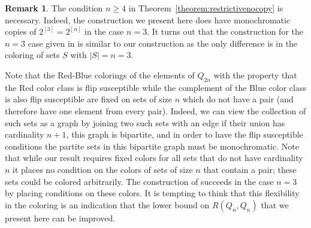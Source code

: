 \documentclass[12pt]{article}
\theoremstyle{definition}
\newtheorem{rek}[thm]{Remark}
\newcommand{\bp}{\begin{proof}}
\newcommand{\ep}{\end{proof}}
\newcommand{\cube}{2^{[n]}}
\begin{document}
\begin{rek}
The condition $ n \ge 4$ in Theorem~\ref{theorem:restrictivenocopy} is necessary. Indeed,
the construction we present here does have monochromatic copies of $ 2^{[3]}= 2^{[n]}$ in the case $n=3$. It turns out that the construction for the $n=3$ case given in \cite{axenovich2017boolean} is similar to our construction as the only difference is in the coloring of sets $S$ with $ |S|=n=3$.

Note that the Red-Blue colorings of the elements of $ Q_{2n}$ with the property that the
Red color class is flip susceptible while the complement of the Blue color class is also
flip susceptible are fixed on
sets of size $n$ which do not have a pair (and therefore have one element from
every pair). Indeed, we can view the collection of 
such sets as a graph by joining two such sets with an edge if their union has cardinality $n+1$, this graph
is bipartite, and in order to have the flip susceptible conditions
the partite sets in this bipartite graph must be monochromatic. Note that while our result requires fixed 
colors for all sets that do not have cardinality $n$ it places no condition on 
the colors of sets of size $n$ that contain a pair; these sets could be colored arbitrarily. 
The construction of \cite{axenovich2017boolean} 
succeeds in the case $n=3$ by placing conditions on these colors. It is tempting 
to think that this flexibility in the coloring is an indication that the lower bound on $ R( Q_n, Q_n)$ 
that we present here can be improved.


\end{rek}

\end{document}
